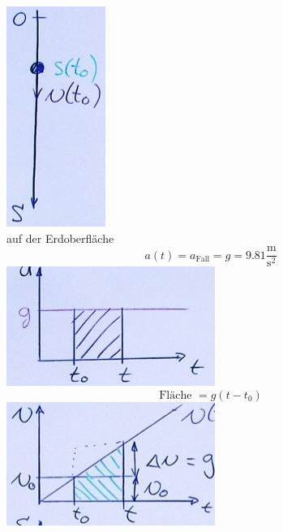 \begin{bsp*}[note = Der freie Fall]
	\includegraphics{Bild8} \\
	auf der Erdoberfläche
	\[ a(t) = a_{\text{Fall}} = g = 9.81 \frac{\text{m}}{{\text{s}}^2} \]
	\includegraphics{Bild9}
	\[ \text{Fläche } = g( t - t_0 ) \]
	\includegraphics{Bild10}
	\begin{gather*}

\end{gather*}
\end{bsp*}

